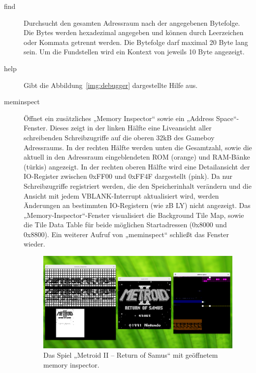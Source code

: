 \documentclass[a4paper]{scrartcl}
\begin{document}
\begin{description}
\item[find] Durchsucht den gesamten Adressraum nach der angegebenen Bytefolge. Die Bytes werden hexadezimal angegeben und können durch Leerzeichen oder Kommata getrennt werden. Die Bytefolge darf maximal 20 Byte lang sein. Um die Fundstellen wird ein Kontext von jeweils 10 Byte angezeigt.
\item[help] Gibt die Abbildung~\ref{img:debugger} dargestellte Hilfe aus.
\item[meminspect] Öffnet ein zusätzliches „Memory Inspector“ sowie ein „Address Space“-Fenster. Dieses zeigt in der linken Hälfte eine Liveansicht aller schreibenden Schreibzugriffe auf die oberen 32kB des Gameboy Adressraums. In der rechten Hälfte werden unten die Gesamtzahl, sowie die aktuell in den Adressraum eingeblendeten ROM (orange) und RAM-Bänke (türkis) angezeigt. In der rechten oberen Hälfte wird eine Detailansicht der IO-Register zwischen 0xFF00 und 0xFF4F dargestellt (pink). Da nur Schreibzugriffe registriert werden, die den Speicherinhalt verändern und die Ansicht mit jedem VBLANK-Interrupt aktualisiert wird, werden Änderungen an bestimmten IO-Registern (wie zB LY) nicht angezeigt. Das „Memory-Inspector“-Fenster visualisiert die Background Tile Map, sowie die Tile Data Table für beide möglichen Startadressen (0x8000 und 0x8800). Ein weiterer Aufruf von „meminspect“ schließt das Fenster wieder.

\begin{figure}[htbp]
\centering
\includegraphics[width=\linewidth]{img/meminspect}
\caption{Das Spiel „Metroid II -- Return of Samus“ mit geöffnetem memory inspector.}
\label{img:meminspect}
\end{figure}


\end{description}
\end{document}
